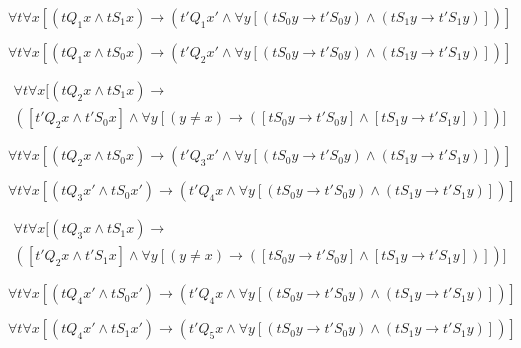 \documentclass[a4paper,11pt]{article}
\begin{document}
\begin{equation}
\forall t \forall x [(tQ_{1}x \land tS_{1}x) \rightarrow (t'Q_{1}x' \land \forall y [(tS_{0}y \rightarrow t'S_{0}y) 
\land (tS_{1}y \rightarrow t'S_{1}y)])]
\end{equation}

\begin{equation}
\forall t \forall x [(tQ_{1}x \land tS_{0}x) \rightarrow (t'Q_{2}x' \land \forall y [(tS_{0}y \rightarrow t'S_{0}y)
\land (tS_{1}y \rightarrow t'S_{1}y)])]
\end{equation}

\begin{multline}
\forall t \forall x [(tQ_{2}x \land tS_{1}x) \rightarrow \\ ([t'Q_{2}x \land t'S_{0}x] \land \forall y [(y \neq x) 
\rightarrow ([tS_{0}y \rightarrow t'S_{0}y] \land [tS_{1}y \rightarrow t'S_{1}y])])]
\end{multline}

\begin{equation}
\forall t \forall x [(tQ_{2}x \land tS_{0}x) \rightarrow (t'Q_{3}x' \land \forall y [(tS_{0}y \rightarrow t'S_{0}y)
\land (tS_{1}y \rightarrow t'S_{1}y)])]
\end{equation}

\begin{equation}
\forall t \forall x [(tQ_{3}x' \land tS_{0}x') \rightarrow (t'Q_{4}x \land \forall y [(tS_{0}y \rightarrow t'S_{0}y)
\land (tS_{1}y \rightarrow t'S_{1}y)])]
\end{equation}

\begin{multline}
\forall t \forall x [(tQ_{3}x \land tS_{1}x) \rightarrow \\ ([t'Q_{2}x \land t'S_{1}x] \land \forall y [(y \neq x)
\rightarrow ([tS_{0}y \rightarrow t'S_{0}y] \land [tS_{1}y \rightarrow t'S_{1}y])])]
\end{multline}

\begin{equation}
\forall t \forall x [(tQ_{4}x' \land tS_{0}x') \rightarrow (t'Q_{4}x \land \forall y [(tS_{0}y \rightarrow t'S_{0}y)
\land (tS_{1}y \rightarrow t'S_{1}y)])]
\end{equation}

\begin{equation}
\forall t \forall x [(tQ_{4}x' \land tS_{1}x') \rightarrow (t'Q_{5}x \land \forall y [(tS_{0}y \rightarrow t'S_{0}y)
\land (tS_{1}y \rightarrow t'S_{1}y)])]
\end{equation}
\end{document}
